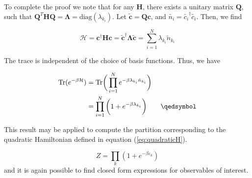 To complete the proof we note that for any $\bm H$, there exists a unitary matrix $\bm Q$, such that $\bm Q^T \bm H \bm Q = \bm \Lambda = \text{diag}(\lambda_{k_i})$. Let $\tilde{\bm c} = \bm Q \bm c$, and $\tilde{n_i} = \tilde{c_i}^\dagger \tilde{c_i}$. Then, we find

\begin{equation*}
\mathcal{H} = \bm c^\dagger \bm H \bm c = \bm \tilde{\bm c}^\dagger \bm \Lambda \tilde{\bm c} = \sum_{i=1}^N \lambda_{k_i} \tilde{n}_{k_i}
\end{equation*}

The trace is independent of the choice of basis functions. Thus, we have

\begin{equation*}
\begin{split}
\text{Tr} ( e^{-\beta \mathcal{H} } ) &= \text{Tr} \bigg( \prod_{i=1}^N e^{-\beta \lambda_{k_i} \tilde{n}_{k_i} } \bigg) \\
&= \prod_{i=1}^N \bigg( 1 + e^{-\beta \lambda_{k_i} } \bigg) \quad\quad \qedsymbol
\end{split}
\end{equation*}

This result may be applied to compute the partition corresponding to the quadratic Hamiltonian defined in equation (\ref{eq:quadraticH}).

\begin{equation}
Z = \prod_k ( 1 + e^{-\beta \varepsilon_k} )
\end{equation}
and it is again possible to find closed form expressions for observables of interest.

